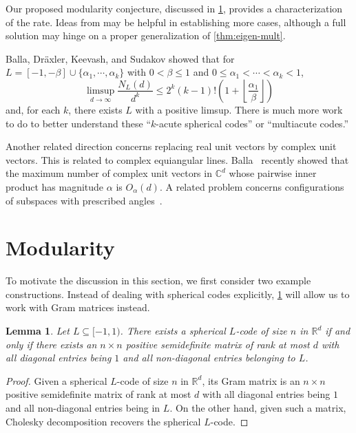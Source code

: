 \documentclass[reqno, 11pt]{amsart}
\newtheorem{lemma}[theorem]{Lemma}
\theoremstyle{definition}
\theoremstyle{remark}
\newcommand{\floor}[1]{\left\lfloor #1 \right\rfloor}
\newcommand{\paren}[1]{\left( #1 \right)}
\newcommand{\CC}{\mathbb{C}}
\newcommand{\RR}{\mathbb{R}}
\begin{document}
Our proposed modularity conjecture, discussed in \cref{sec:modularity}, provides a characterization of the rate.
Ideas from \cite{BDKS18,JP20,JP21+,JTYZZ23} may be helpful in establishing more cases, although a full solution may hinge on a proper generalization of \cref{thm:eigen-mult}.

Balla, Dr\"{a}xler, Keevash, and Sudakov \cite{BDKS18} showed that for $L = [-1, -\beta] \cup \{\alpha_1, \cdots, \alpha_k\}$ with $0 < \beta \leq 1$ and $0 \leq \alpha_1 < \cdots < \alpha_k < 1$,
\[
\limsup_{d \to \infty} \frac{N_L(d)}{d^k} \leq 2^k(k-1)!\paren{1 + \floor{\frac{\alpha_1}{\beta}}}
\]
and, for each $k$, there exists $L$ with a positive limsup.
There is much more work to do to better understand these ``$k$-acute spherical codes'' or ``multiacute codes.''

Another related direction concerns replacing real unit vectors by complex unit vectors. This is related to complex equiangular lines. 
Balla~\cite{Bal21+} recently showed that the maximum number of complex unit vectors in $\CC^d$ whose pairwise inner product has magnitude $\alpha$ is $O_\alpha(d)$. 
A related problem concerns configurations of subspaces with prescribed angles~\cite{LS73subspace,BS19}.




\section{Modularity}\label{sec:modularity}

To motivate the discussion in this section, we first consider two example constructions. Instead of dealing with spherical codes explicitly, \cref{lem:gram} will allow us to work with Gram matrices instead. 

\begin{lemma}\label{lem:gram}
	Let $L \subseteq [-1,1)$. There exists a spherical $L$-code of size $n$ in $\RR^d$ if and only if there exists an $n \times n$ positive semidefinite matrix of rank at most $d$ with all diagonal entries being $1$ and all non-diagonal entries belonging to $L$.
\end{lemma}

\begin{proof}
	Given a spherical $L$-code of size $n$ in $\RR^d$, its Gram matrix is an $n\times n$ positive semidefinite matrix of rank at most $d$ with all diagonal entries being $1$ and  all non-diagonal entries being in $L$. On the other hand, given such a matrix, Cholesky decomposition recovers the spherical $L$-code.
\end{proof}
\end{document}
